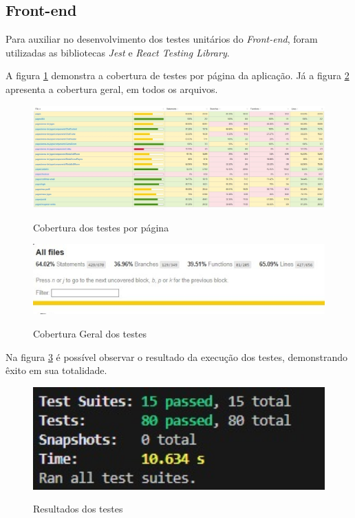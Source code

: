 \subsection{Front-end}
Para auxiliar no desenvolvimento dos testes unitários do \textit{\gls{Front-end}}, foram utilizadas as bibliotecas \textit{Jest} e \textit{React Testing Library}.

A figura \ref{coverageFront} demonstra a cobertura de testes por página da aplicação. Já a figura \ref{coverageGeralFront} apresenta a cobertura geral, em todos os arquivos.

\begin{figure}[H]
    \caption{Cobertura dos testes por página}
	\centering
	\includegraphics[width=1\textwidth]{imagens/testes/TestesUnitariosFrontend/coverageFront.jpeg}
	\label{coverageFront}
\end{figure}

\begin{figure}[H]
    \caption{Cobertura Geral dos testes}
	\centering
	\includegraphics[width=1\textwidth]{imagens/testes/TestesUnitariosFrontend/coverageGeralFront.jpeg}
	\label{coverageGeralFront}
\end{figure}

Na figura \ref{resultadosTestesFront} é possível observar o resultado da execução dos testes, demonstrando êxito em sua totalidade.

\begin{figure}[H]
    \caption{Resultados dos testes}
	\centering
	\includegraphics[width=1\textwidth]{imagens/testes/TestesUnitariosFrontend/resultadosTestesFront.jpeg}
	\label{resultadosTestesFront}
\end{figure}